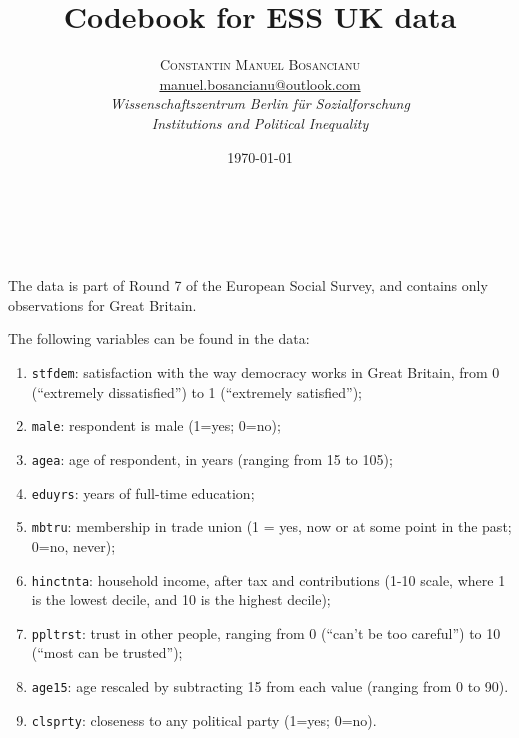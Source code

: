 \documentclass[a4paper, 11pt]{article}
\title{\textbf{Codebook for ESS UK data}}
\author{\textsc{Constantin Manuel Bosancianu}\\ %
  \href{mailto:manuel.bosancianu@outlook.com}{manuel.bosancianu@outlook.com}\\
  \textit{Wissenschaftszentrum Berlin f\"{u}r Sozialforschung\\
Institutions and Political Inequality}} %
\date{\today} %
\makeatletter
\renewcommand{\maketitle}{
  \begin{flushleft}
    {\Large\@title}\\
    \vspace{10pt}
    {\large\@author}\\
    \vspace{10pt}
    {\@date}
    \vspace{40pt}
  \end{flushleft}
}
\makeatother
\begin{document}
\maketitle

The data is part of Round 7 of the European Social Survey, and contains only observations for Great Britain.

The following variables can be found in the data:

\begin{enumerate}
\item \texttt{stfdem}: satisfaction with the way democracy works in Great Britain, from 0 (``extremely dissatisfied'') to 1 (``extremely satisfied''); 
\item \texttt{male}: respondent is male (1=yes; 0=no);
\item \texttt{agea}: age of respondent, in years (ranging from 15 to 105);
\item \texttt{eduyrs}: years of full-time education;
\item \texttt{mbtru}: membership in trade union (1 = yes, now or at some point in the past; 0=no, never);
\item \texttt{hinctnta}: household income, after tax and contributions (1-10 scale, where 1 is the lowest decile, and 10 is the highest decile);
\item \texttt{ppltrst}: trust in other people, ranging from 0 (``can't be too careful'') to 10 (``most can be trusted'');
\item \texttt{age15}: age rescaled by subtracting 15 from each value (ranging from 0 to 90).
\item \texttt{clsprty}: closeness to any political party (1=yes; 0=no).
\end{enumerate}
\end{document}
